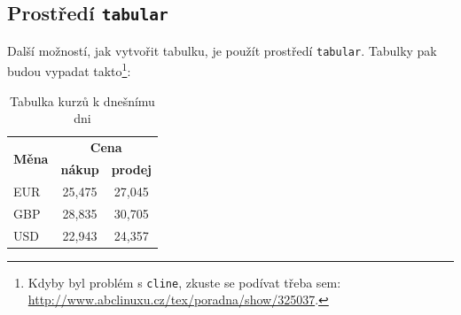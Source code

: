 \documentclass[a4paper, 11pt]{article}
\begin{document}
    \subsection{Prostředí \texttt{tabular}}
    Další možností, jak vytvořit tabulku, je použít prostředí \texttt{tabular}. Tabulky pak budou vypadat takto\footnote{Kdyby byl problém s \texttt{cline}, zkuste se podívat třeba sem: \url{http://www.abclinuxu.cz/tex/poradna/show/325037}.}: 
    
    \shorthandoff{-}
    \begin{table}[hb]
    \begin{center}
    \begin{tabular}{|l|c|c|}
    \hline
    \multicolumn{1}{|c|}{\multirow{2}{*}{\textbf{Měna}}} & \multicolumn{2}{c|}{\textbf{Cena}} \\ \cline{2-3} 
    \multicolumn{1}{|c|}{} & \textbf{nákup} & \textbf{prodej} \\ \hline
    EUR & 25,475 & 27,045 \\ \hline
    GBP & 28,835 & 30,705 \\ \hline
    USD & 22,943 & 24,357 \\ \hline
    \end{tabular}
    \caption{Tabulka kurzů k dnešnímu dni}
    \label{tabulka-1}
    \end{center}
    \end{table}
\end{document}
